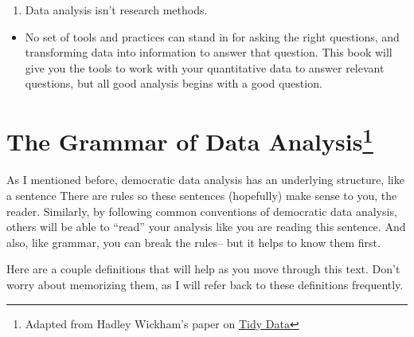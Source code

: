 \documentclass[]{book}
\providecommand{\tightlist}{%
  \setlength{\itemsep}{0pt}\setlength{\parskip}{0pt}}
\begin{document}
\begin{enumerate}
\def\labelenumi{\arabic{enumi}.}
\setcounter{enumi}{2}
\tightlist
\item
  Data analysis isn't research methods.
\end{enumerate}

\begin{itemize}
\tightlist
\item
  No set of tools and practices can stand in for asking the right questions, and transforming data into information to answer that question. This book will give you the tools to work with your quantitative data to answer relevant questions, but all good analysis begins with a good question.
\end{itemize}

\hypertarget{the-grammar-of-data-analysis}{%
\section[The Grammar of Data Analysis]{\texorpdfstring{The Grammar of Data Analysis\footnote{Adapted from Hadley Wickham's paper on \href{https://vita.had.co.nz/papers/tidy-data.pdf}{Tidy Data}}}{The Grammar of Data Analysis}}\label{the-grammar-of-data-analysis}}

As I mentioned before, democratic data analysis has an underlying structure, like a sentence There are rules so these sentences (hopefully) make sense to you, the reader. Similarly, by following common conventions of democratic data analysis, others will be able to ``read'' your analysis like you are reading this sentence. And also, like grammar, you can break the rules-- but it helps to know them first.

Here are a couple definitions that will help as you move through this text. Don't worry about memorizing them, as I will refer back to these definitions frequently.
\end{document}
